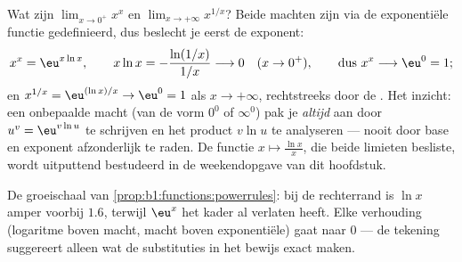 \begin{example}\label{ex:b1:functions:xx}
Wat zijn $\lim_{x \to 0^+} x^x$ en $\lim_{x \to +\infty} x^{1/x}$?
Beide machten zijn via de exponentiële functie gedefinieerd, dus
beslecht je eerst de exponent:
\[
x^x = \eu^{x\ln x}, \qquad
x\ln x = -\frac{\ln(1/x)}{1/x} \longrightarrow 0
\quad (x \to 0^+),
\qquad\text{dus } x^x \longrightarrow \eu^0 = 1 ;
\]
en $x^{1/x} = \eu^{(\ln x)/x} \to \eu^0 = 1$ als $x \to +\infty$,
rechtstreeks door de . Het inzicht: een onbepaalde
macht (van de vorm $0^0$ of $\infty^0$) pak je \emph{altijd} aan door
$u^v = \eu^{v\ln u}$ te schrijven en het product $v \ln u$ te
analyseren --- nooit door base en exponent afzonderlijk te raden. De
functie $x \mapsto \frac{\ln x}{x}$, die beide limieten besliste, wordt
uitputtend bestudeerd in de weekendopgave van dit hoofdstuk.
\end{example}

\begin{omfigure}

{\small De groeischaal van \cref{prop:b1:functions:powerrules}: bij de
rechterrand is $\ln x$ amper voorbij $1.6$, terwijl $\eu^x$ het kader
al verlaten heeft. Elke verhouding (logaritme boven macht, macht boven
exponentiële) gaat naar $0$ --- de tekening suggereert alleen wat de
substituties in het bewijs exact maken.}
\end{omfigure}

